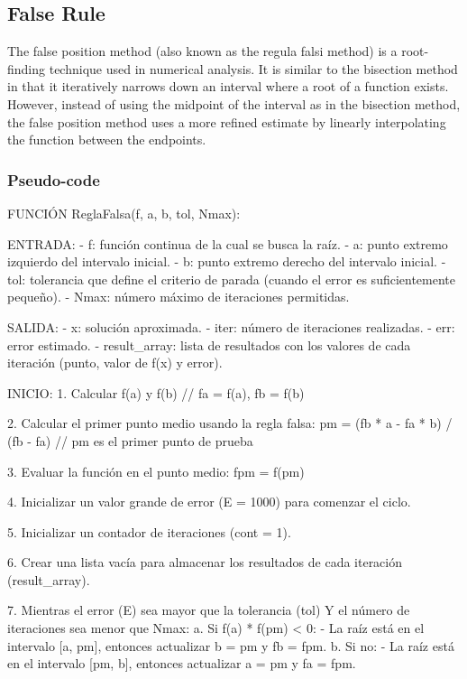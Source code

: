 \documentclass{article}
\begin{document}
\break

    \subsection{False Rule}\label{subsec:false_rule}

        The false position method (also known as the regula falsi method) is a root-finding technique used in numerical analysis.
        It is similar to the bisection method in that it iteratively narrows down an interval where a root of a function exists.
        However, instead of using the midpoint of the interval as in the bisection method, the false position method uses a
        more refined estimate by linearly interpolating the function between the endpoints.

        \subsubsection{Pseudo-code}
FUNCIÓN ReglaFalsa(f, a, b, tol, Nmax):

    ENTRADA:
    - f: función continua de la cual se busca la raíz.
    - a: punto extremo izquierdo del intervalo inicial.
    - b: punto extremo derecho del intervalo inicial.
    - tol: tolerancia que define el criterio de parada (cuando el error es suficientemente pequeño).
    - Nmax: número máximo de iteraciones permitidas.

    SALIDA:
    - x: solución aproximada.
    - iter: número de iteraciones realizadas.
    - err: error estimado.
    - result_array: lista de resultados con los valores de cada iteración (punto, valor de f(x) y error).

    INICIO:
    1. Calcular f(a) y f(b)  // fa = f(a), fb = f(b)

    2. Calcular el primer punto medio usando la regla falsa:
       pm = (fb * a - fa * b) / (fb - fa)  // pm es el primer punto de prueba

    3. Evaluar la función en el punto medio:
       fpm = f(pm)

    4. Inicializar un valor grande de error (E = 1000) para comenzar el ciclo.

    5. Inicializar un contador de iteraciones (cont = 1).

    6. Crear una lista vacía para almacenar los resultados de cada iteración (result_array).

    7. Mientras el error (E) sea mayor que la tolerancia (tol) Y el número de iteraciones sea menor que Nmax:
        a. Si f(a) * f(pm) < 0:
            - La raíz está en el intervalo [a, pm], entonces actualizar b = pm y fb = fpm.
        b. Si no:
            - La raíz está en el intervalo [pm, b], entonces actualizar a = pm y fa = fpm.
\end{document}
